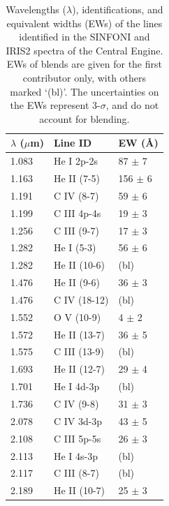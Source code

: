 \documentclass[preprint,times]{aastex61}
\begin{document}
\begin{table}
\renewcommand\tablename{Supplementary Information Table}
  \small
  \caption{\label{tab:line_id_rex1a} Wavelengths ($\lambda$), identifications, and equivalent widths (EWs) of the lines identified in the SINFONI and IRIS2 spectra of the Central Engine. EWs of blends are given for the first contributor only, with others marked `(bl)'. The uncertainties on the EWs represent 3-$\sigma$, and do not account for blending.}
  \begin{center}
    \begin{tabular}{lll}
      \hline
      $\lambda$ ($\mu$m) & Line ID   & EW ({\AA}) \\
       \hline
       \hline 
      1.083 & He I 2p-2s     &   87 $\pm$ 7  \\
      1.163 & He II (7-5)    &  156 $\pm$ 6 \\
      1.191 & C IV (8-7)     &   59 $\pm$ 6 \\
      1.199 & C III 4p-4s    &   19 $\pm$ 3 \\
      1.256 & C III (9-7)    &   17  $\pm$ 3 \\
      1.282 & He I (5-3)   &   56 $\pm$ 6 \\
      1.282 & He II (10-6)   & (bl)\\
      1.476 & He II (9-6)  &   36 $\pm$ 3\\
      1.476 & C IV (18-12)   & (bl)\\
      1.552 & O V (10-9)   &    4 $\pm$ 2 \\
      1.572 & He II (13-7)  &   36 $\pm$ 5 \\
      1.575 & C III (13-9)   & (bl)\\
      1.693 & He II (12-7)   &   29 $\pm$ 4 \\
      1.701 & He I 4d-3p   & (bl)\\
      1.736 & C IV (9-8)     &   31 $\pm$ 3 \\
      2.078 & C IV 3d-3p     &   43  $\pm$ 5 \\
      2.108 & C III 5p-5s    &   26  $\pm$ 3 \\
      2.113 & He I 4s-3p     & (bl)\\
      2.117 & C III (8-7)    & (bl)\\
      2.189 & He II (10-7)   &   25  $\pm$ 3 \\
    \hline\end{tabular}
\end{center}
\end{table}
\end{document}
